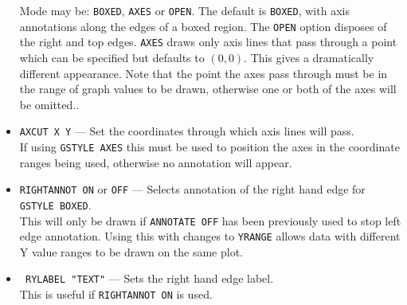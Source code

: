 \documentclass[a4paper,twoside,11pt]{article}
\newcommand{\textttc}[1]{\texttt{\textcolor{OurRed}{#1}}}
\begin{document}
\begin{itemize}
	Mode may be:
	\texttt{BOXED}, \texttt{AXES} or \texttt{OPEN}. The default is \texttt{BOXED}, with axis annotations along the
	edges of a boxed region. The \texttt{OPEN} option disposes of the right and top edges.
	\texttt{AXES} draws only axis lines that pass through a point which can be specified but defaults to $(0,0)$. This
	gives a dramatically different appearance. Note that the point the axes pass through must be in the range of
	graph values to be drawn, otherwise one or both of the axes will be omitted..
\item \textttc{AXCUT X Y} --- Set the coordinates through which axis lines will pass. \\
	If using \texttt{GSTYLE AXES} this must
	be used to position the axes in the coordinate ranges being used, otherwise no annotation will appear.
\item \textttc{RIGHTANNOT ON} or \texttt{OFF} --- Selects annotation of the right hand edge for \texttt{GSTYLE BOXED}. \\
	This will
	only be drawn if \texttt{ANNOTATE OFF} has been previously used to stop left edge annotation. Using this with changes to 
	\texttt{YRANGE} allows data with different Y value ranges to be drawn on the same plot.
\item \textttc{ RYLABEL "TEXT"} --- Sets the right hand edge label.\\
	This is useful if \texttt{RIGHTANNOT ON} is used.
\end{itemize}
\end{document}
